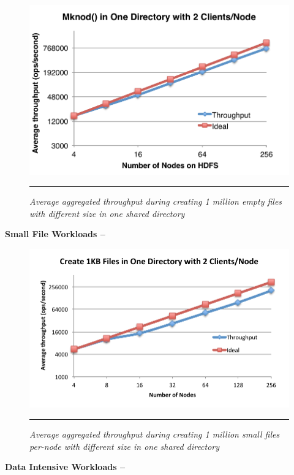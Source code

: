 \begin{figure}[t]  %
\centerline{\includegraphics[scale=0.6]{./figs/hdfs_empty_file}}
\vspace{10pt}
\caption{
\textit{Average aggregated throughput during creating 1 million empty files
with different size in one shared directory}
}
\hrule
\label{graph:smallfiles}
\end{figure}       %


\textbf{Small File Workloads -- }

\begin{figure}[t]  %
\centerline{\includegraphics[scale=0.6]{./figs/hdfs_small_file}}
\vspace{10pt}
\caption{
\textit{Average aggregated throughput during creating 1 million small files
per-node with different size in one shared directory}
}
\hrule
\label{graph:smallfiles}
\end{figure}       %


\textbf{Data Intensive Workloads -- }

